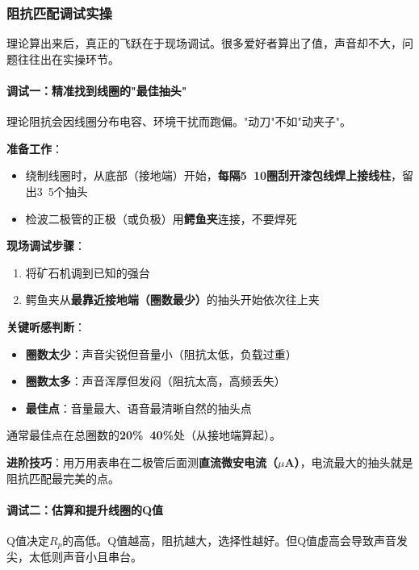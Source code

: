 \subsubsection{阻抗匹配调试实操}
\label{sec:impedance_matching_practice}

理论算出来后，真正的飞跃在于现场调试。很多爱好者算出了值，声音却不大，问题往往出在实操环节。

\paragraph{调试一：精准找到线圈的"最佳抽头"}

理论阻抗会因线圈分布电容、环境干扰而跑偏。"动刀"不如"动夹子"。

\textbf{准备工作}：
\begin{itemize}
    \item 绕制线圈时，从底部（接地端）开始，\textbf{每隔5~10圈刮开漆包线焊上接线柱}，留出3~5个抽头
    \item 检波二极管的正极（或负极）用\textbf{鳄鱼夹}连接，不要焊死
\end{itemize}

\textbf{现场调试步骤}：
\begin{enumerate}
    \item 将矿石机调到已知的强台
    \item 鳄鱼夹从\textbf{最靠近接地端（圈数最少）}的抽头开始依次往上夹
\end{enumerate}

\textbf{关键听感判断}：
\begin{itemize}
    \item \textbf{圈数太少}：声音尖锐但音量小（阻抗太低，负载过重）
    \item \textbf{圈数太多}：声音浑厚但发闷（阻抗太高，高频丢失）
    \item \textbf{最佳点}：音量最大、语音最清晰自然的抽头点
\end{itemize}

通常最佳点在总圈数的\textbf{20\%~40\%}处（从接地端算起）。

\textbf{进阶技巧}：用万用表串在二极管后面测\textbf{直流微安电流（$\mu$A）}，电流最大的抽头就是阻抗匹配最完美的点。

\paragraph{调试二：估算和提升线圈的Q值}

Q值决定$R_p$的高低。Q值越高，阻抗越大，选择性越好。但Q值虚高会导致声音发尖，太低则声音小且串台。

